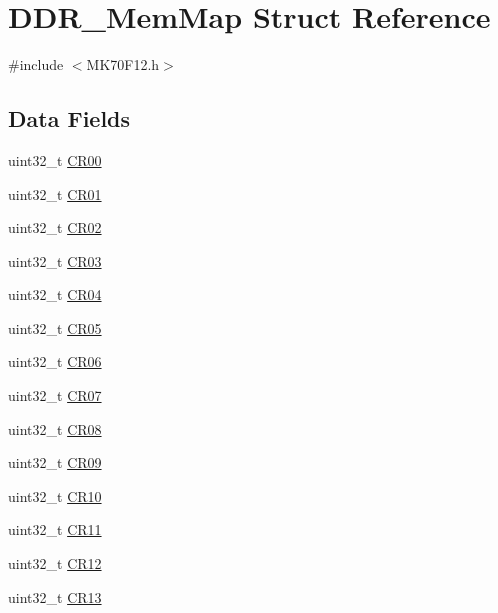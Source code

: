 \hypertarget{struct_d_d_r___mem_map}{}\section{D\+D\+R\+\_\+\+Mem\+Map Struct Reference}
\label{struct_d_d_r___mem_map}


{\ttfamily \#include $<$M\+K70\+F12.\+h$>$}

\subsection*{Data Fields}
\begin{DoxyCompactItemize}
\item 
uint32\+\_\+t \hyperlink{struct_d_d_r___mem_map_a9e2a08fd3e016d4fed8f6011d07ca770}{C\+R00}
\item 
uint32\+\_\+t \hyperlink{struct_d_d_r___mem_map_af1dc0e0c5a179c7a8fda956060e0e4bc}{C\+R01}
\item 
uint32\+\_\+t \hyperlink{struct_d_d_r___mem_map_a5364339b60e833e81fba593e0bf881c2}{C\+R02}
\item 
uint32\+\_\+t \hyperlink{struct_d_d_r___mem_map_a38710acc7d8645341d7555a75e15b3e7}{C\+R03}
\item 
uint32\+\_\+t \hyperlink{struct_d_d_r___mem_map_a01670a4f2214c3e8d43ddcc88b66bf63}{C\+R04}
\item 
uint32\+\_\+t \hyperlink{struct_d_d_r___mem_map_a13bdb8afba015908d30885298c47261c}{C\+R05}
\item 
uint32\+\_\+t \hyperlink{struct_d_d_r___mem_map_a3c8bfa47279aca171819027f1da87abb}{C\+R06}
\item 
uint32\+\_\+t \hyperlink{struct_d_d_r___mem_map_a7a21cb4617532dbd071b15ca7874a6c3}{C\+R07}
\item 
uint32\+\_\+t \hyperlink{struct_d_d_r___mem_map_a663b17c8696f979ed804d4aee9048f8a}{C\+R08}
\item 
uint32\+\_\+t \hyperlink{struct_d_d_r___mem_map_a29563dba3e22c074a37699e7210938dc}{C\+R09}
\item 
uint32\+\_\+t \hyperlink{struct_d_d_r___mem_map_a46aa57cf50301c488d379d5bc3db0d9c}{C\+R10}
\item 
uint32\+\_\+t \hyperlink{struct_d_d_r___mem_map_a2f39b32471bec36efac6c1d2eacfc9b1}{C\+R11}
\item 
uint32\+\_\+t \hyperlink{struct_d_d_r___mem_map_a0ba795cf9fec601e947772a28e6bab4f}{C\+R12}
\item 
uint32\+\_\+t \hyperlink{struct_d_d_r___mem_map_a21800e14bea8977a1406c1afcaf0e4a5}{C\+R13}

\end{DoxyCompactItemize}
